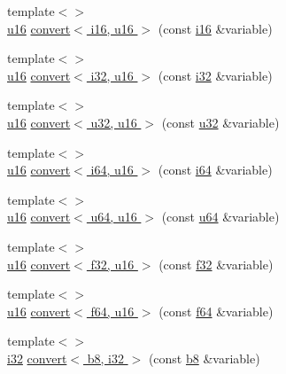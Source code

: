 \begin{DoxyCompactItemize}
\item 
{\footnotesize template$<$$>$ }\\\hyperlink{types_8h_ace9d960e74685e2cd84b36132dbbf8aa}{u16} \hyperlink{namespacecrap_ad121bfccced8a2786feb7ad83ddfec14}{convert$<$ i16, u16 $>$} (const \hyperlink{types_8h_ad309dbcaeea13aa602d686964156ea0b}{i16} \&variable)
\item 
{\footnotesize template$<$$>$ }\\\hyperlink{types_8h_ace9d960e74685e2cd84b36132dbbf8aa}{u16} \hyperlink{namespacecrap_aedea8c36e401cf31c08fcec78b446ecf}{convert$<$ i32, u16 $>$} (const \hyperlink{types_8h_a48d6cd8e4135fb2ff7e7f2dac84089ec}{i32} \&variable)
\item 
{\footnotesize template$<$$>$ }\\\hyperlink{types_8h_ace9d960e74685e2cd84b36132dbbf8aa}{u16} \hyperlink{namespacecrap_a902ebf49bee089d32a290ecdc1a81433}{convert$<$ u32, u16 $>$} (const \hyperlink{types_8h_afaa62991928fb9fb18ff0db62a040aba}{u32} \&variable)
\item 
{\footnotesize template$<$$>$ }\\\hyperlink{types_8h_ace9d960e74685e2cd84b36132dbbf8aa}{u16} \hyperlink{namespacecrap_a7b7efd524581eacbe81afb2bb7ebcc5f}{convert$<$ i64, u16 $>$} (const \hyperlink{types_8h_a85cb35fbe5bf2961d7ad5f26814a91a2}{i64} \&variable)
\item 
{\footnotesize template$<$$>$ }\\\hyperlink{types_8h_ace9d960e74685e2cd84b36132dbbf8aa}{u16} \hyperlink{namespacecrap_a903cfc358de12827b776ab0780bb83e8}{convert$<$ u64, u16 $>$} (const \hyperlink{types_8h_a3f7e2bcbb0b4c338f3c4f6c937cd4234}{u64} \&variable)
\item 
{\footnotesize template$<$$>$ }\\\hyperlink{types_8h_ace9d960e74685e2cd84b36132dbbf8aa}{u16} \hyperlink{namespacecrap_ac483f38af015d14c6aa1af7a66f66b6d}{convert$<$ f32, u16 $>$} (const \hyperlink{types_8h_a154db6eda6a99565cb060a1da4b4c930}{f32} \&variable)
\item 
{\footnotesize template$<$$>$ }\\\hyperlink{types_8h_ace9d960e74685e2cd84b36132dbbf8aa}{u16} \hyperlink{namespacecrap_aba406e73f0b101c41062e85cdf2c6e60}{convert$<$ f64, u16 $>$} (const \hyperlink{types_8h_a76c9f53497f766e57b184bc8a93ab73f}{f64} \&variable)
\item 
{\footnotesize template$<$$>$ }\\\hyperlink{types_8h_a48d6cd8e4135fb2ff7e7f2dac84089ec}{i32} \hyperlink{namespacecrap_a59222e4ebbcf88cb1fed756bdf33cb2c}{convert$<$ b8, i32 $>$} (const \hyperlink{types_8h_a74eb47b4ab9e428eab7b91b3b877fa6c}{b8} \&variable)

\end{DoxyCompactItemize}
